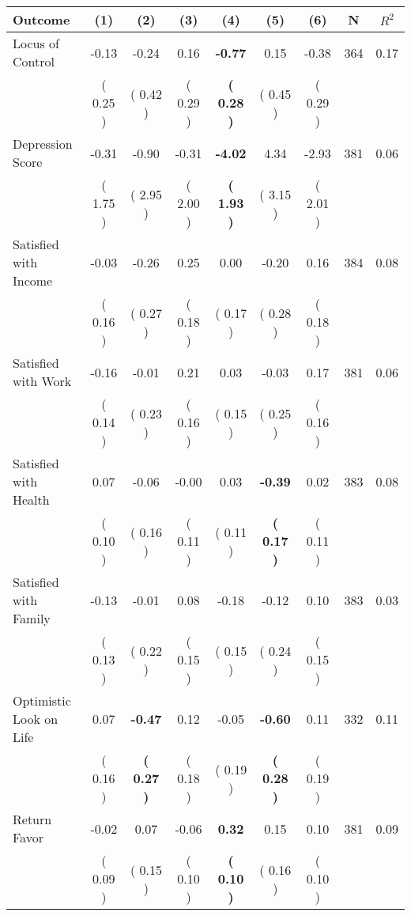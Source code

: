 \begin{tabular}{lcccccccc}
\toprule
 \textbf{Outcome} & \textbf{(1)} & \textbf{(2)} & \textbf{(3)} & \textbf{(4)} & \textbf{(5)} & \textbf{(6)} & \textbf{N} & \textbf{$ R^2$} \\
\midrule
Locus of Control &     -0.13 &     -0.24 &      0.16 & \textbf{    -0.77} &      0.15 &     -0.38 & 364 &       0.17 \\ 
 & (     0.25 ) & (     0.42 ) & (     0.29 ) & \textbf{(     0.28 )} & (     0.45 ) & (     0.29 ) & \\
Depression Score &     -0.31 &     -0.90 &     -0.31 & \textbf{    -4.02} &      4.34 &     -2.93 & 381 &       0.06 \\ 
 & (     1.75 ) & (     2.95 ) & (     2.00 ) & \textbf{(     1.93 )} & (     3.15 ) & (     2.01 ) & \\
Satisfied with Income &     -0.03 &     -0.26 &      0.25 &      0.00 &     -0.20 &      0.16 & 384 &       0.08 \\ 
 & (     0.16 ) & (     0.27 ) & (     0.18 ) & (     0.17 ) & (     0.28 ) & (     0.18 ) & \\
Satisfied with Work &     -0.16 &     -0.01 &      0.21 &      0.03 &     -0.03 &      0.17 & 381 &       0.06 \\ 
 & (     0.14 ) & (     0.23 ) & (     0.16 ) & (     0.15 ) & (     0.25 ) & (     0.16 ) & \\
Satisfied with Health &      0.07 &     -0.06 &     -0.00 &      0.03 & \textbf{    -0.39} &      0.02 & 383 &       0.08 \\ 
 & (     0.10 ) & (     0.16 ) & (     0.11 ) & (     0.11 ) & \textbf{(     0.17 )} & (     0.11 ) & \\
Satisfied with Family &     -0.13 &     -0.01 &      0.08 &     -0.18 &     -0.12 &      0.10 & 383 &       0.03 \\ 
 & (     0.13 ) & (     0.22 ) & (     0.15 ) & (     0.15 ) & (     0.24 ) & (     0.15 ) & \\
Optimistic Look on Life &      0.07 & \textbf{    -0.47} &      0.12 &     -0.05 & \textbf{    -0.60} &      0.11 & 332 &       0.11 \\ 
 & (     0.16 ) & \textbf{(     0.27 )} & (     0.18 ) & (     0.19 ) & \textbf{(     0.28 )} & (     0.19 ) & \\
Return Favor &     -0.02 &      0.07 &     -0.06 & \textbf{     0.32} &      0.15 &      0.10 & 381 &       0.09 \\ 
 & (     0.09 ) & (     0.15 ) & (     0.10 ) & \textbf{(     0.10 )} & (     0.16 ) & (     0.10 ) & \\

\end{tabular}
